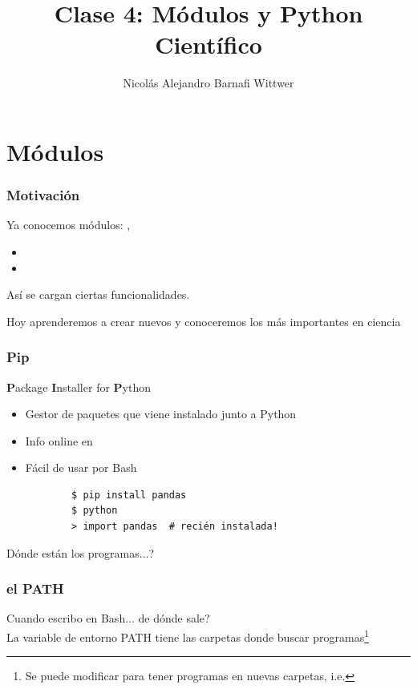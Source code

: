 \documentclass[14pt,aspectratio=169,xcolor=dvipsnames]{beamer}
\title[short title]{Clase 4: Módulos y Python Científico}
\subtitle{}
\author[NA Barnafi] {Nicolás Alejandro Barnafi Wittwer}
\institute[UC|CMM] 
{
    Pontificia Universidad Católica de Chile \\
    Centro de Modelamiento Matemático
}
\date{}
\begin{document}
\begin{frame}
    \maketitle
\end{frame}
\section{Módulos}
\begin{frame}[fragile]\frametitle{Motivación}
    Ya conocemos módulos: , 
    \begin{itemize}
        \item {}
        \item {}
    \end{itemize}
    Así se cargan ciertas funcionalidades. 

    \pause Hoy aprenderemos a crear nuevos y conoceremos los más importantes en ciencia
\end{frame}
\begin{frame}[fragile]\frametitle{Pip}
    \textbf{P}ackage \textbf{I}nstaller for \textbf{P}ython
    
    \begin{itemize}
        \item Gestor de paquetes que viene instalado junto a Python
        \item Info online en 
        \item Fácil de usar por Bash
            \begin{verbatim}
        $ pip install pandas
        $ python
        > import pandas  # recién instalada!
            \end{verbatim}
    \end{itemize}
    
    \pause Dónde están los programas...?
\end{frame}
\begin{frame}\frametitle{el PATH}
    Cuando escribo  en Bash... de dónde sale? \\

    \vspace{0.5cm}
    La variable de entorno PATH tiene las carpetas donde buscar programas\footnote{Se puede modificar para tener programas en nuevas carpetas, i.e. }

    \pause {}
\end{frame}
\end{document}
